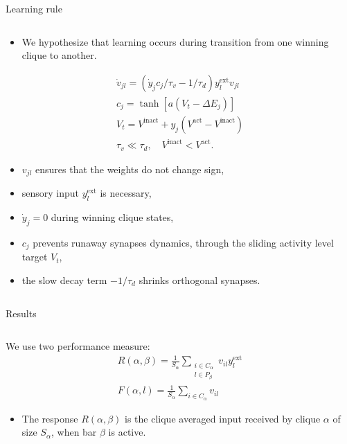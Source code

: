 \documentclass[final,hyperref={pdfpagelabels=false}]{beamer}
\begin{document}
\begin{frame}
\begin{columns}
\begin{column}{.60\textwidth}
\begin{minipage}[T]{.95\textwidth}
{\begin{minipage}[T]{.55\textwidth}
\begin{block}{Learning rule}
\begin{columns}
\begin{column}[T]{1\textwidth}
\begin{itemize}
							\item We hypothesize that learning occurs during transition from one winning clique to another.
						\end{itemize}
						\begin{gather*}
						\dot{v}_{jl} = \left(\dot{y}_j c_j / \tau_v  - 1 / \tau_d\right) y_l^{\text{ext}} v_{jl}  \\
						c_j = \tanh{\left[a \left(V_t - \Delta E_j \right)\right]} \\
						V_t = V^{\text{inact}} + y_j \left(V^{\text{act}} - V^{\text{inact}}\right)\\
						\tau_v \ll \tau_d, \quad V^{\text{inact}} < V^{\text{act}}.	
						\end{gather*}
						\begin{itemize}
							\item $v_{jl}$ ensures that the weights do not change sign,
							\item sensory input $y_l^{\text{ext}}$ is necessary,
							\item $\dot{y}_j = 0$ during winning clique states,
							\item $c_j$ prevents runaway synapses dynamics, through the sliding activity level target $V_t$,
							\item the slow decay term $-1/\tau_d$ shrinks orthogonal synapses.
						\end{itemize}
					\end{column}
			
				\end{columns}
			\end{block}
		\vfill
			\begin{block}{Results}
				\begin{columns}									
					\begin{column}[T]{1\textwidth}
						We use two performance measure:
						\begin{gather*}
						R(\alpha, \beta) = \frac{1}{S_\alpha} \sum_{\substack{i\in C_\alpha \\ l \in P_\beta}} v_{il} y_l^{\text{ext}} \\
						F(\alpha, l) = \frac{1}{S_\alpha} \sum_{i\in C_\alpha} v_{il}
						\end{gather*}
						\begin{itemize}
							\item The response $R(\alpha, \beta)$ is the clique averaged input received by clique $\alpha$ of size $S_\alpha$, when bar $\beta$ is active.
							

\end{itemize}
\end{column}
\end{columns}
\end{block}
\end{minipage}}
\end{minipage}
\end{column}
\end{columns}
\end{frame}
\end{document}
